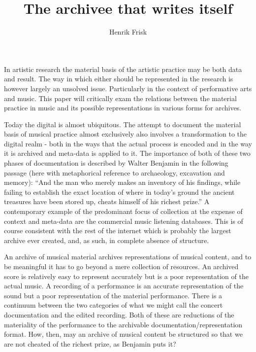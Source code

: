 \documentclass[12pt]{article}
\author{Henrik Frisk}
\title{The archivee that writes itself}
\begin{document}
\maketitle

\noindent
In artistic research the material basis of the artistic practice may be both data and result. The way in which either should be represented in the research is however largely an unsolved issue. Particularly in the context of performative arts and music. This paper will critically exam the relations between the material practice in music and its possible representations in various forms for archives.

Today the digital is almost ubiquitous. The attempt to document the material basis of musical practice almost exclusively also involves a transformation to the digital realm - both in the ways that the actual process is encoded and in the way it is archived and meta-data is applied to it. The importance of both of these two phases of documentation is described by Walter Benjamin in the following passage (here with metaphorical reference to archaeology, excavation and memory): ``And the man who merely makes an inventory of his findings, while failing to establish the exact location of where in today's ground the ancient treasures have been stored up, cheats himself of his richest prize.''\citep[p. 576]{benjamin2005} A contemporary example of the predominant focus of collection at the expense of context and meta-data are the commercial music listening databases. This is of course consistent with the rest of the internet which is probably the largest archive ever created, and, as such, in complete absence of structure. %

An archive of musical material archives representations of musical content, and to be meaningful it has to go beyond a mere collection of resources. An archived score is relatively easy to represent accurately but is a poor representation of the actual music. A recording of a performance is an accurate representation of the sound but a poor representation of the material performance. There is a continuum between the two categories of what we might call the concert documentation and the edited recording. Both of these are reductions of the materiality of the performance to the archivable documentation/representation format. How, then, may an archive of musical content be structured so that we are not cheated of the richest prize, as Benjamin puts it? 
\end{document}
